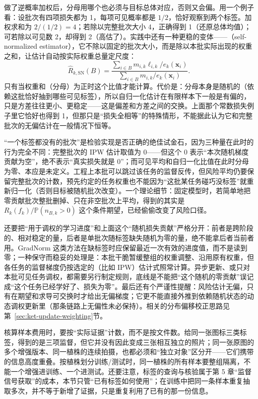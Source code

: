 做了逆概率加权后，分母用哪个也必须与目标总体对应，否则又会偏。用一个例子看：设批次有四项损失都为 1，每项可见概率都是 $1/2$，恰好观察到两个标签。加权求和为 $2/(1/2)=4$；若除以完整批次大小 4，正确得到 1（还原总体均值）；可若除以可见数 2，却得到 2（高估了）。实践中还有一种更稳的变体——（self-normalized estimator），它不除以固定的批次大小，而是除以本批实际出现的权重之和，让估计自动按实际权重总量定尺度：
\begin{equation}
  \widehat R_{k,\mathrm{SN}}(B)
  =\frac{\sum_{i\in B}m_{i,k}\ell_{i,k}/e_k(\bm x_i)}
    {\sum_{i\in B}m_{i,k}/e_k(\bm x_i)}.
  \label{eq:ket-sharing-label-self-normalized}
\end{equation}
只有当权重和（分母）为正时这个比值才能计算。代价是：分母本身是随机的（依赖这批恰好抽到哪些可见标签），所以自归一化估计在有限样本下一般是有偏的，只是方差往往更小、更稳定——这是偏差和方差之间的交换。上面那个常数损失例子里它恰好也得到 1，但那只是“损失全相等”的特殊情形，不能据此认为它和完整批次的无偏估计在一般情况下恒等。

“一个标签都没有的批次”是检验实现是否正确的绝佳试金石，因为三种量在此时的行为完全不同：完整批次的 IPW 估计取值为 0——但这个 0 表示“本次随机梯度贡献为空”，绝不表示“真实损失就是 0”；而可见平均和自归一化比值在此时分母为零、本应是未定义。工程上本批可以跳过该任务的监督反传，但风险平均仍要保留完整批次的计数，预先约定的任务权重也不能因为“这批某任务碰巧没标签”就重新归一化（否则目标被随机批次改变）。一个理论细节：固定模型时，若简单地把零贡献批次整批删掉、只在非空批次上平均，得到的其实是 $R_k(f_k)/\mathbb P(n_{B,k}>0)$ 这个条件期望，已经偷偷改变了风险口径。

还要把“用于调权的学习进度”和上面这个“随机损失贡献”严格分开：前者是跨阶段的、相对稳定的量，后者是单批次随标签缺失随机为零的量，绝不能拿后者当前者用。GradNorm 这类方法在缺标签时应保留最近一次有效的进度值，而不是读到零；一种保守而稳妥的处理是：本批干脆暂缓整组的权重调整、沿用原有权重，但各任务的监督梯度仍按选定的（比如 IPW）估计式照常计算。异步更新、或只对本批可见任务调权，都需要另行制定规则，底线是不能把“这个随机的零贡献”误记成“这个任务已经学好了、损失为零”。最后还有个严谨性提醒：风险估计无偏，只有在期望和求导可交换时才给出无偏梯度；它更不能直接外推到依赖随机状态的动态调权更新里（那条链路上无偏性未必保持）。相关的分布偏移校正思路见第~\ref{sec:ket-update-weighting}节。

核算样本费用时，要按“实际证据”计数，而不是按文件数。给同一张图标三类标签，得到的是三项监督，但它并没有因此变成三张相互独立的照片；同一张原图的多个增强版本、同一植株的连续拍摄，也都必须和“独立对象”区分开——它们携带的信息高度重叠。按植株划分训练/测试时，同一植株的所有样本要整组隔离，不能一个增强进训练、一个进测试。还要注意，标签的查询与核验属于第 5 章“监督信号获取”的成本，本节只管“已有标签如何使用”；在训练中把同一条样本重复抽取多次，并不等于新增了证据，只是重复利用了已有的那一份信息。

